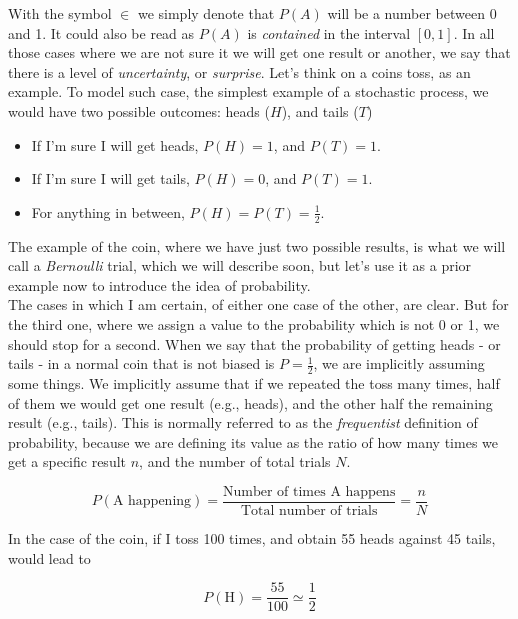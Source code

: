 \documentclass{book}
\begin{document}
With the symbol $ \in$ we simply denote that $P(A)$ will be a number between 0 and 1. It could also be read as $P(A)$ is \textit{contained} in the interval $[0, 1]$. In all those cases where we are not sure it we will get one result or another, we say that there is a level of \textit{uncertainty}, or \textit{surprise}. Let's think on a coins toss, as an example. To model such case, the simplest example of a stochastic process, we would have two possible outcomes: heads ($H$), and tails ($T$)

\begin{itemize}
\item If I'm sure I will get heads, $P(H) = 1$, and $P(T) = 1$.
\item If I'm sure I will get tails, $P(H) = 0$, and $P(T) = 1$.
\item For anything in between, $P(H) = P(T) = \frac{1}{2}$.
\end{itemize}

The example of the coin, where we have just two possible results, is what we will call a \textit{Bernoulli} trial, which we will describe soon, but let's use it as a prior example now to introduce the idea of probability.\\

The cases in which I am certain, of either one case of the other, are clear. But for the third one, where we assign a value to the probability which is not 0 or 1, we should stop for a second. When we say that the probability of getting heads - or tails - in a normal coin that is not biased is $P = \frac{1}{2}$, we are implicitly assuming some things. We implicitly assume that if we repeated the toss many times, half of them we would get one result (e.g., heads), and the other half the remaining result (e.g., tails). This is normally referred to as the \textit{frequentist} definition of probability, because we are defining its value as the ratio of how many times we get a specific result $n$, and the number of total trials $N$.

\begin{equation}
	P(\text{A happening}) = \frac{\text{Number of times A happens}}{\text{Total number of trials}} = \frac{n}{N}
\end{equation}

In the case of the coin, if I toss 100 times, and obtain 55 heads against 45 tails, would lead to 

\begin{equation}
	P(\text{H}) = \frac{55}{100} \simeq \frac{1}{2} \nonumber
\end{equation}
\end{document}
